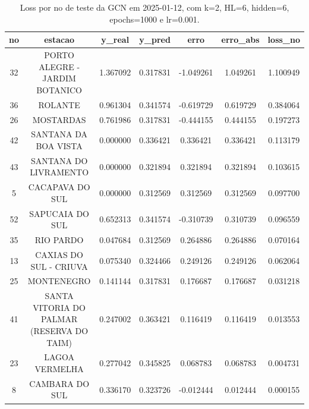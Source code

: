 \begin{table}[h]
\centering
\caption{Loss por no de teste da GCN em 2025-01-12, com k=2, HL=6, hidden=6, epochs=1000 e lr=0.001.}
\label{tab:gcn_loss_k2_hl6_h6_e1000_d20250112}
\begin{tabular}{ccccccc}
\toprule
no & estacao & y\_real & y\_pred & erro & erro\_abs & loss\_no \\
\midrule
32 & PORTO ALEGRE - JARDIM BOTANICO & 1.367092 & 0.317831 & -1.049261 & 1.049261 & 1.100949 \\
36 & ROLANTE & 0.961304 & 0.341574 & -0.619729 & 0.619729 & 0.384064 \\
26 & MOSTARDAS & 0.761986 & 0.317831 & -0.444155 & 0.444155 & 0.197273 \\
42 & SANTANA DA BOA VISTA & 0.000000 & 0.336421 & 0.336421 & 0.336421 & 0.113179 \\
43 & SANTANA DO LIVRAMENTO & 0.000000 & 0.321894 & 0.321894 & 0.321894 & 0.103615 \\
5 & CACAPAVA DO SUL & 0.000000 & 0.312569 & 0.312569 & 0.312569 & 0.097700 \\
52 & SAPUCAIA DO SUL & 0.652313 & 0.341574 & -0.310739 & 0.310739 & 0.096559 \\
35 & RIO PARDO & 0.047684 & 0.312569 & 0.264886 & 0.264886 & 0.070164 \\
13 & CAXIAS DO SUL - CRIUVA & 0.075340 & 0.324466 & 0.249126 & 0.249126 & 0.062064 \\
25 & MONTENEGRO & 0.141144 & 0.317831 & 0.176687 & 0.176687 & 0.031218 \\
41 & SANTA VITORIA DO PALMAR (RESERVA DO TAIM) & 0.247002 & 0.363421 & 0.116419 & 0.116419 & 0.013553 \\
23 & LAGOA VERMELHA & 0.277042 & 0.345825 & 0.068783 & 0.068783 & 0.004731 \\
8 & CAMBARA DO SUL & 0.336170 & 0.323726 & -0.012444 & 0.012444 & 0.000155 \\
\bottomrule
\end{tabular}
\end{table}
